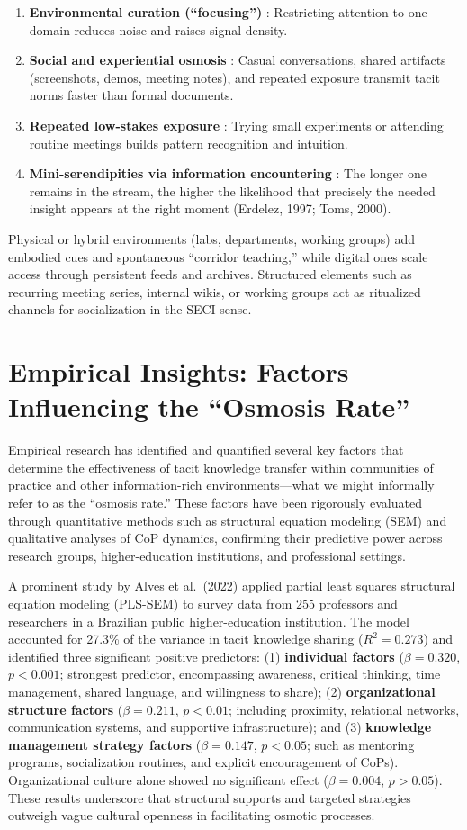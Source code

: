 \documentclass[11pt,a4paper]{article}
\begin{document}
\begin{enumerate}
\item \textbf{Environmental curation (``focusing'')} : Restricting attention to one domain reduces noise and raises signal density.
\item \textbf{Social and experiential osmosis} : Casual conversations, shared artifacts (screenshots, demos, meeting notes), and repeated exposure transmit tacit norms faster than formal documents.
\item \textbf{Repeated low-stakes exposure} : Trying small experiments or attending routine meetings builds pattern recognition and intuition.
\item \textbf{Mini-serendipities via information encountering} : The longer one remains in the stream, the higher the likelihood that precisely the needed insight appears at the right moment (Erdelez, 1997; Toms, 2000).
\end{enumerate}

Physical or hybrid environments (labs, departments, working groups) add embodied cues and spontaneous ``corridor teaching,'' while digital ones scale access through persistent feeds and archives. Structured elements such as recurring meeting series, internal wikis, or working groups act as ritualized channels for socialization in the SECI sense.

\section{Empirical Insights: Factors Influencing the ``Osmosis Rate''}
Empirical research has identified and quantified several key factors that determine the effectiveness of tacit knowledge transfer within communities of practice and other information-rich environments---what we might informally refer to as the ``osmosis rate.'' These factors have been rigorously evaluated through quantitative methods such as structural equation modeling (SEM) and qualitative analyses of CoP dynamics, confirming their predictive power across research groups, higher-education institutions, and professional settings.

A prominent study by Alves et al.\ (2022) applied partial least squares structural equation modeling (PLS-SEM) to survey data from 255 professors and researchers in a Brazilian public higher-education institution. The model accounted for 27.3\% of the variance in tacit knowledge sharing ($R^2 = 0.273$) and identified three significant positive predictors: (1) \textbf{individual factors} ($\beta = 0.320$, $p < 0.001$; strongest predictor, encompassing awareness, critical thinking, time management, shared language, and willingness to share); (2) \textbf{organizational structure factors} ($\beta = 0.211$, $p < 0.01$; including proximity, relational networks, communication systems, and supportive infrastructure); and (3) \textbf{knowledge management strategy factors} ($\beta = 0.147$, $p < 0.05$; such as mentoring programs, socialization routines, and explicit encouragement of CoPs). Organizational culture alone showed no significant effect ($\beta = 0.004$, $p > 0.05$). These results underscore that structural supports and targeted strategies outweigh vague cultural openness in facilitating osmotic processes.
\end{document}
